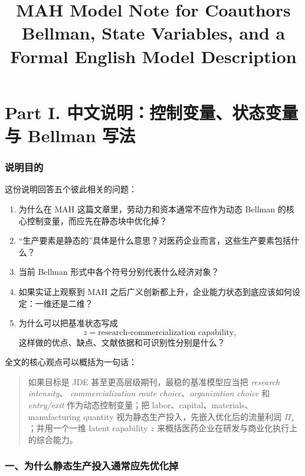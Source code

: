 \documentclass[12pt,fontset=none]{ctexart}
\title{MAH Model Note for Coauthors\\
Bellman, State Variables, and a Formal English Model Description}
\author{}
\date{}
\begin{document}
\maketitle
\tableofcontents
\newpage

\part*{Part I. 中文说明：控制变量、状态变量与 Bellman 写法}


\section{说明目的}

这份说明回答五个彼此相关的问题：

\begin{enumerate}[leftmargin=2em]
    \item 为什么在 MAH 这篇文章里，劳动力和资本通常不应作为动态 Bellman 的核心控制变量，而应先在静态块中优化掉？
    \item “生产要素是静态的”具体是什么意思？对医药企业而言，这些生产要素包括什么？
    \item 当前 Bellman 形式中各个符号分别代表什么经济对象？
    \item 如果实证上观察到 MAH 之后广义创新都上升，企业能力状态到底应该如何设定：一维还是二维？
    \item 为什么可以把基准状态写成
    \[
    z=\text{research-commercialization capability},
    \]
    这样做的优点、缺点、文献依据和可识别性分别是什么？
\end{enumerate}

全文的核心观点可以概括为一句话：

\begin{quote}
如果目标是 JDE 甚至更高层级期刊，最稳的基准模型应当把 \emph{research intensity}、
\emph{commercialization route choice}、\emph{organization choice} 和
\emph{entry/exit} 作为动态控制变量；把 labor、capital、materials、
manufacturing quantity 视为静态生产投入，先嵌入优化后的流量利润
\(\Pi_s\)；并用一个一维 latent capability \(z\) 来概括医药企业在研发与商业化执行上的综合能力。
\end{quote}

\section{一、为什么静态生产投入通常应先优化掉}
\end{document}
